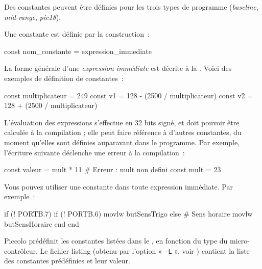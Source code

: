 

\thispagestyle{empty}

Des constantes peuvent être définies pour les trois types de programme (\emph{baseline}, \emph{mid-range}, \emph{pic18}).

Une constante est définie par la construction~:

\begin{piccolo}
const nom_constante = expression_immediate
\end{piccolo}


La forme générale d’une \emph{expression immédiate} est décrite à la . Voici des exemples de définition de constantes~:

\begin{piccolo}
const multiplicateur = 249
const v1 = 128 - (2500 / multiplicateur)
const v2 = 128 + (2500 / multiplicateur)
\end{piccolo}

L’évaluation des expressions s’effectue en 32 bits signé, et doit pouvoir être calculée à la compilation ; elle peut faire référence à d’autres constantes, du moment qu’elles sont définies auparavant dans le programme. Par exemple, l’écriture suivante déclenche une erreur à la compilation~:

\begin{piccolo}
const valeur = mult * 11 # Erreur : mult non defini
const mult = 23 
\end{piccolo}

Vous pouvez utiliser une constante dans toute expression immédiate. Par exemple~:

\begin{piccolo}
if (! PORTB.7)
  if (! PORTB.6)
     movlw butSensTrigo
   else # Sens horaire
     movlw butSensHoraire
  end
end
\end{piccolo}



Piccolo prédéfinit les constantes listées dans le , en fonction du type du micro-contrôleur. Le fichier listing (obtenu par l'option « \texttt{-L} », voir ) contient la liste des constantes prédéfinies et leur valeur.

